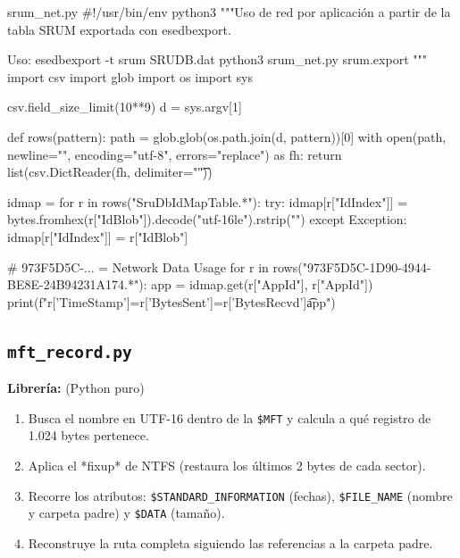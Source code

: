 \documentclass[11pt,a4paper]{article}
\begin{document}
\begin{codigopython}{srum\_net.py}
#!/usr/bin/env python3
"""Uso de red por aplicación a partir de la tabla SRUM exportada con esedbexport.

Uso:
  esedbexport -t srum SRUDB.dat
  python3 srum_net.py srum.export
"""
import csv
import glob
import os
import sys

csv.field_size_limit(10**9)
d = sys.argv[1]

def rows(pattern):
    path = glob.glob(os.path.join(d, pattern))[0]
    with open(path, newline="", encoding="utf-8", errors="replace") as fh:
        return list(csv.DictReader(fh, delimiter="\t"))

idmap = {}
for r in rows("SruDbIdMapTable.*"):
    try:
        idmap[r["IdIndex"]] = bytes.fromhex(r["IdBlob"]).decode("utf-16le").rstrip("")
    except Exception:
        idmap[r["IdIndex"]] = r["IdBlob"]

# {973F5D5C-...} = Network Data Usage
for r in rows("{973F5D5C-1D90-4944-BE8E-24B94231A174}.*"):
    app = idmap.get(r["AppId"], r["AppId"])
    print(f"{r['TimeStamp']}\tsent={r['BytesSent']}\trecv={r['BytesRecvd']}\t{app}")
\end{codigopython}

\subsection{\texttt{mft\_record.py}}
\textbf{Librería:} (Python puro)
\begin{enumerate}

\item Busca el nombre en UTF-16 dentro de la \texttt{\$MFT} y calcula a qué registro de 1.024 bytes pertenece.

\item Aplica el *fixup* de NTFS (restaura los últimos 2 bytes de cada sector).

\item Recorre los atributos: \texttt{\$STANDARD\_INFORMATION} (fechas), \texttt{\$FILE\_NAME} (nombre y carpeta padre) y \texttt{\$DATA} (tamaño).

\item Reconstruye la ruta completa siguiendo las referencias a la carpeta padre.

\end{enumerate}
\end{document}
